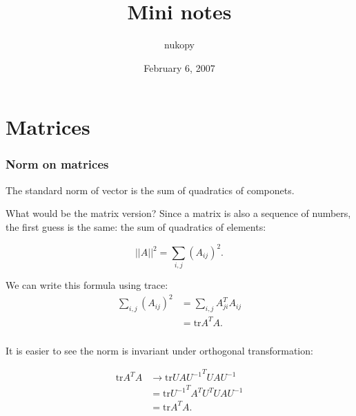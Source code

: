 \documentclass[dvipdfmx,cjk]{beamer}
\theoremstyle{example}
\newcommand{\tr}{\text{tr}}
\newcommand{\transpose}[1]{{#1}^T}
\newcommand{\inverse}[1]{{#1}^{-1}}
\newcommand{\norm}[1]{||{#1}||}
\begin{document}
\title[Sample of Beamer]{Mini notes}
\author[nukopy]{nukopy}
\date{February 6, 2007}

\begin{frame}
\titlepage
\end{frame}

\begin{frame}
\tableofcontents
\end{frame}

\section{Matrices}
\begin{frame}
\frametitle{Norm on matrices} %

The standard norm of vector is the sum of quadratics of componets.

What would be the matrix version? Since a matrix is also a sequence of numbers,
 the first guess is the same: the sum of quadratics of elements:

\begin{equation}
    \norm{A}^2 = \sum_{i,j} (A_{ij})^2.
\end{equation}

We can write this formula using trace:
\begin{align}
    \sum_{i,j} (A_{ij})^2 &= \sum_{i,j} \transpose{A}_{ji} A_{ij} \\
    &= \tr \transpose{A} A.
\end{align}
\end{frame}

\begin{frame}
    \frametitle{}
    It is easier to see the norm is invariant under orthogonal transformation:

    \begin{align}
        \tr \transpose{A} A &\to \tr \transpose{U A \inverse{U}} {U A \inverse{U}} \\ 
        &= \tr \transpose{\inverse{U}} \transpose{A} \transpose{U} U A \inverse{U} \\ 
        &= \tr \transpose{A} A.
    \end{align}
\end{frame}
\end{document}
